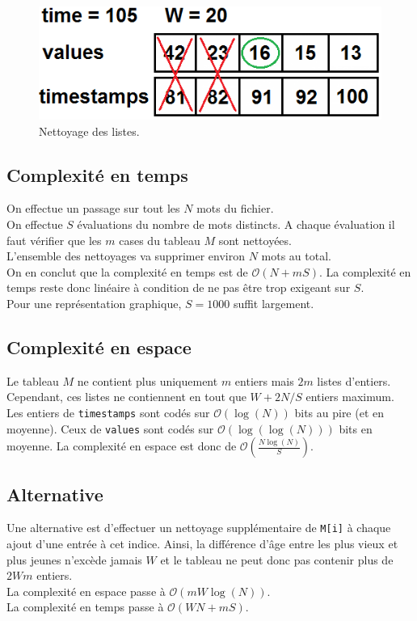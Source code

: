 \documentclass[12pt,a4paper,titlepage]{article}
\newcommand{\class}[1]{\texttt{#1}}
\begin{document}
\begin{figure}[!h]
	\centering
	\includegraphics[scale=0.5]{pictures/picSlidingWindow1.png}
	\caption{Nettoyage des listes.}
\end{figure}

\subsection{Complexité en temps}
On effectue un passage sur tout les $N$ mots du fichier.\\
On effectue $S$ évaluations du nombre de mots distincts. A chaque évaluation il faut vérifier que les $m$ cases du tableau $M$ sont nettoyées.\\
L'ensemble des nettoyages va supprimer environ $N$ mots au total.\\

On en conclut que la complexité en temps est de $\mathcal{O}(N + mS)$. La complexité en temps reste donc linéaire à condition de ne pas être trop exigeant sur $S$.\\
Pour une représentation graphique, $S=1000$ suffit largement.

\subsection{Complexité en espace}
Le tableau $M$ ne contient plus uniquement $m$ entiers mais $2m$ listes d'entiers.\\
Cependant, ces listes ne contiennent en tout que $W+2N/S$ entiers maximum.
Les entiers de \class{timestamps} sont codés sur $\mathcal{O}(\log(N))$ bits au pire (et en moyenne).
Ceux de \class{values} sont codés sur $\mathcal{O}( \log(\log(N)) )$ bits en moyenne.
La complexité en espace est donc de $\mathcal{O}(\frac{N\log(N)}{S})$.

\subsection{Alternative}
Une alternative est d'effectuer un nettoyage supplémentaire de \class{M[i]} à chaque ajout d'une entrée à cet indice. Ainsi, la différence d'âge entre les plus vieux et plus jeunes n'excède jamais $W$ et le tableau ne peut donc pas contenir plus de $2Wm$ entiers.\\
La complexité en espace passe à $\mathcal{O}(mW\log(N))$.\\
La complexité en temps passe à  $\mathcal{O}(WN + mS)$.\\
\end{document}
